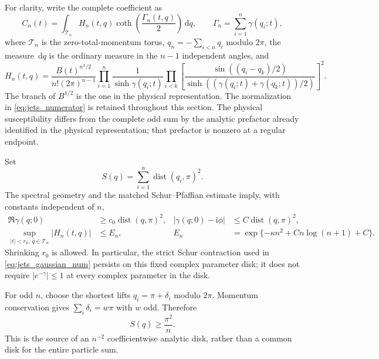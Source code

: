 \documentclass[11pt]{article}
\numberwithin{equation}{section}
\theoremstyle{definition}
\newcommand{\dd}{\,\mathrm d}
\newcommand{\ii}{\mathrm i}
\newcommand{\dist}{\operatorname{dist}}
\begin{document}
For clarity, write the complete coefficient as
\begin{equation}\label{eq:jets_full_coefficient}
 C_n(t)=\int_{\mathcal T_n}H_n(t,q)
        \coth\!\left(\frac{\Gamma_n(t,q)}2\right)\dd q,
 \qquad \Gamma_n=\sum_{i=1}^n\gamma(q_i;t),
\end{equation}
where $\mathcal T_n$ is the zero-total-momentum torus,
$q_n=-\sum_{i<n}q_i$ modulo $2\pi$, the measure $\dd q$ is the
ordinary measure in the $n-1$ independent angles, and
\begin{equation}\label{eq:jets_numerator}
 H_n(t,q)=\frac{B(t)^{n^2/2}}{n!(2\pi)^{n-1}}
 \prod_{i=1}^n\frac1{\sinh\gamma(q_i;t)}
 \prod_{i<k}\left[
  \frac{\sin((q_i-q_k)/2)}
       {\sinh((\gamma(q_i;t)+\gamma(q_k;t))/2)}
 \right]^2.
\end{equation}
The branch of $B^{1/2}$ is the one in the physical representation. The
normalization in \eqref{eq:jets_numerator} is retained throughout this
section. The physical susceptibility differs from the complete odd sum
by the analytic prefactor already identified in the physical
representation; that prefactor is nonzero at a regular endpoint.

Set
\[
 S(q)=\sum_{i=1}^n\dist(q_i,\pi)^2.
\]
The spectral geometry and the matched Schur--Pfaffian estimate imply,
with constants independent of $n$,
\begin{align}
 \Re\gamma(q;0)&\ge c_0\dist(q,\pi)^2,
 &|\gamma(q;0)-\ii\phi|&\le C\dist(q,\pi)^2,\label{eq:jets_attenuation0}\\
 \sup_{|t|<r_0,\ q\in\mathcal T_n}|H_n(t,q)|
 &\le E_n,
 &E_n&=\exp\{-\kappa n^2+C n\log(n+1)+C\}.
 \label{eq:jets_gaussian_num}
\end{align}
Shrinking $r_0$ is allowed. In particular, the strict Schur contraction
used in \eqref{eq:jets_gaussian_num} persists on this fixed complex
parameter disk; it does not require $|e^{-\gamma}|\le1$ at every
complex parameter in the disk.

For odd $n$, choose the shortest lifts $q_i=\pi+\delta_i$ modulo
$2\pi$. Momentum conservation gives
$\sum_i\delta_i=w\pi$ with $w$ odd. Therefore
\begin{equation}\label{eq:jets_momentum_minimum}
 S(q)\ge\frac{\pi^2}{n}.
\end{equation}
This is the source of an $n^{-2}$ coefficientwise analytic disk, rather
than a common disk for the entire particle sum.
\end{document}
